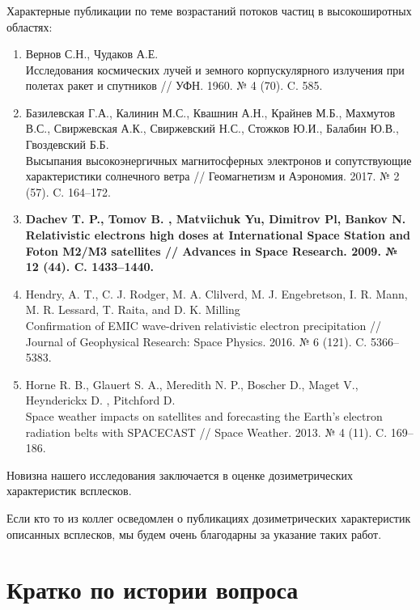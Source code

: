 \documentclass[t, aspectratio=43]{beamer}
\begin{document}
\begin{frame}	
\frametitle{\insertsection} 
{\tiny 
Характерные публикации по теме возрастаний потоков частиц в
высокоширотных областях:

\begin{enumerate}
	\item
	Вернов С.Н., Чудаков А.Е. \\ Исследования космических лучей и земного корпускулярного излучения при полетах ракет и спутников // УФН. 1960. № 4 (70). C. 585.
	\item
	Базилевская Г.А., Калинин М.С., Квашнин А.Н., Крайнев М.Б., Махмутов В.С., Свиржевская А.К., Свиржевский Н.С., Стожков Ю.И., Балабин Ю.В., Гвоздевский Б.Б. \\ Высыпания высокоэнергичных магнитосферных электронов и сопутствующие характеристики солнечного ветра // Геомагнетизм и Аэрономия. 2017. № 2 (57). C. 164–172.	
	\item
	\textbf{Dachev T. P., 	Tomov B. ,	Matviichuk Yu,	Dimitrov Pl, Bankov N.\\ Relativistic electrons high doses at International Space Station and Foton M2/M3 satellites // Advances in Space Research. 2009. № 12 (44). C. 1433–1440.}
	\item
	Hendry, A. T., C. J. Rodger, M. A. Clilverd, M. J. Engebretson, I. R. Mann, M. R. Lessard, T. Raita, and D. K. Milling \\ Confirmation of EMIC wave-driven relativistic electron precipitation // Journal of Geophysical Research: Space Physics. 2016. № 6 (121). C. 5366–5383.
	\item Horne R. B.,  Glauert S. A., 	Meredith N. P., 	Boscher D., 	Maget V., Heynderickx D. ,	Pitchford D. \\ Space weather impacts on satellites and forecasting the Earth’s electron radiation belts with SPACECAST // Space Weather. 2013. № 4 (11). C. 169–186.
\end{enumerate}
}
{\tiny 


Новизна нашего исследования заключается в оценке дозиметрических характеристик всплесков.

Если кто то из коллег осведомлен о публикациях дозиметрических характеристик описанных всплесков, мы будем очень благодарны за указание таких работ.
}



\end{frame}

\section{Кратко по истории вопроса}\label{header-n22}
\end{document}
